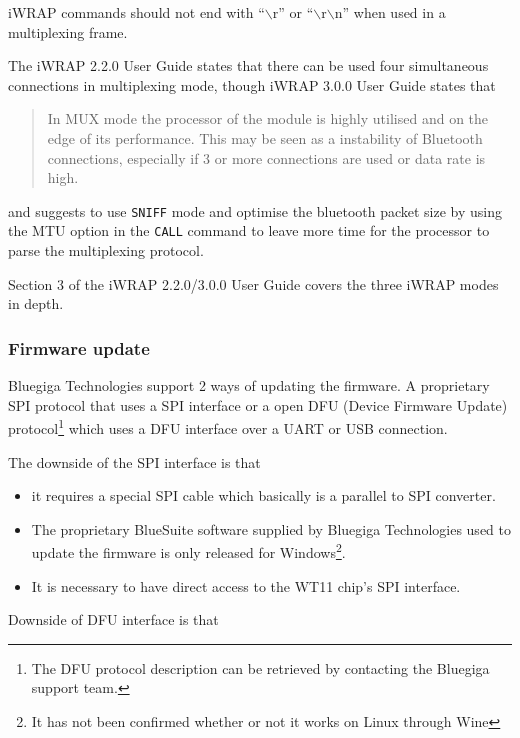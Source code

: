 \documentclass[a4paper, oneside, final]{memoir}
\begin{document}
iWRAP commands should not end with ``$\backslash$r'' or
``$\backslash$r$\backslash$n'' when used in a multiplexing frame.

The iWRAP 2.2.0 User Guide states that there can be used four simultaneous
connections in multiplexing mode, though iWRAP 3.0.0 User Guide \cite[section
6.20.3, page 120]{iWRAP300UG} states that

\begin{quote}
  In MUX mode the processor of the module is highly utilised and on the edge of
  its performance. This may be seen as a instability of Bluetooth connections,
  especially if 3 or more connections are used or data rate is high.
\end{quote}

\noindent
and suggests to use \texttt{SNIFF} mode and optimise the bluetooth packet size
by using the MTU option in the \texttt{CALL} command to leave more time for the
processor to parse the multiplexing protocol. 

Section 3 of the iWRAP 2.2.0/3.0.0 User Guide covers the three iWRAP modes in
depth.


\subsubsection{Firmware update}

Bluegiga Technologies support 2 ways of updating the firmware. A proprietary SPI
protocol that uses a SPI interface or a open DFU (Device Firmware Update)
protocol\footnote{The DFU protocol description can be retrieved by contacting
  the Bluegiga support team.} which uses a DFU interface over a UART or USB connection.

The downside of the SPI interface is that 

\begin{itemize}
\item it requires a special SPI cable which basically is a parallel to SPI
  converter.

\item The proprietary BlueSuite software supplied by Bluegiga Technologies used
  to update the firmware is only released for Windows\footnote{It has not been
    confirmed whether or not it works on Linux through Wine}.

\item It is necessary to have direct access to the WT11 chip's SPI interface.
\end{itemize}

Downside of DFU interface is that 
\end{document}
